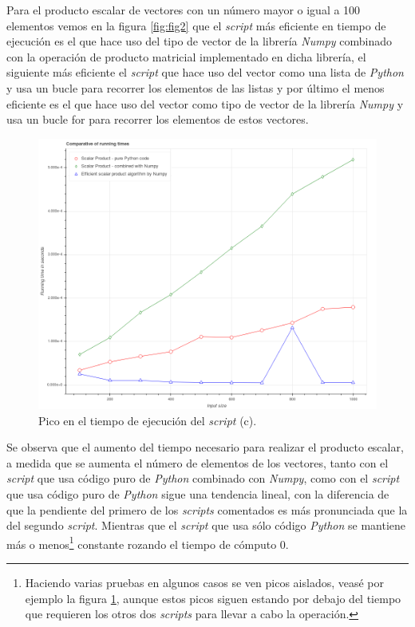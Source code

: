 \documentclass[12pt,twoside]{article}
\begin{document}
Para el producto escalar de vectores con un número mayor o igual a 100 elementos vemos en la figura \ref{fig:fig2} que el \textit{script} más eficiente en tiempo de ejecución es el que hace uso del tipo de vector de la librería \textit{Numpy} combinado con la operación de producto matricial implementado en dicha librería, el siguiente más eficiente el \textit{script} que hace uso del vector como una lista de \textit{Python} y usa un bucle para recorrer los elementos de las listas y por último el menos eficiente es el que hace uso del vector como tipo de vector de la librería \textit{Numpy} y usa un bucle for para recorrer los elementos de estos vectores.

\begin{figure}[hbt]
\begin{center}
	\includegraphics[width=1\textwidth]{22.png}
	\caption{Pico en el tiempo de ejecución del \textit{script} (c).}
	\label{fig:fig3}
\end{center}
\end{figure}

Se observa que el aumento del tiempo necesario para realizar el producto escalar, a medida que se aumenta el número de elementos de los vectores, tanto con el \textit{script} que usa código puro de \textit{Python} combinado con \textit{Numpy}, como con el \textit{script} que usa código puro de \textit{Python} sigue una tendencia lineal, con la diferencia de que la pendiente del primero de los \textit{scripts} comentados es más pronunciada que la del segundo \textit{script}. Mientras que el \textit{script} que usa sólo código \textit{Python} se mantiene más o menos\footnote{Haciendo varias pruebas en algunos casos se ven picos aislados, veasé por ejemplo la figura \ref{fig:fig3}, aunque estos picos siguen estando por debajo del tiempo que requieren los otros dos \textit{scripts} para llevar a cabo la operación.} constante rozando el tiempo de cómputo 0.
\end{document}
